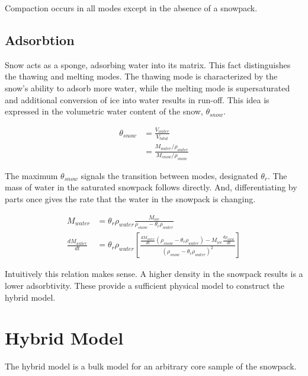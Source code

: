 \documentclass{article}
\begin{document}
Compaction occurs in all modes except in the
absence of a snowpack.


\subsection{Adsorbtion}

Snow acts as a sponge, adsorbing water into its matrix.
This fact distinguishes the thawing and melting modes.
The thawing mode is characterized by the snow's ability
to adsorb more water, while the melting mode is supersaturated
and additional conversion of ice into water results in run-off.
This idea is expressed in the volumetric water content of the snow,
$\theta_{snow}$.

\begin{align}
\theta_{snow} &= \frac{V_{water}}{V_{total}} \\
   &= \frac{M_{water}/ \rho_{water}}{M_{snow}/\rho_{snow}}
\end{align}

The maximum $\theta_{snow}$ signals the transition between
modes, designated $\theta_{r}$.
The mass of water in the saturated snowpack follows directly.
And, differentiating by parts once gives the rate that the water in the
snowpack is changing.

\begin{align}
M_{water}  &= \theta_{r} \rho_{water}
      \frac{M_{ice}}{\rho_{snow} - \theta_{r} \rho_{water}} \\
\frac{d M_{water}}{dt} &=  \theta_{r} \rho_{water}
   \left[ \frac{\frac{d M_{water}}{dt} (\rho_{snow} - \theta_{r} \rho_{water})
                  - M_{ice} \frac{d \rho_{snow}}{dt} }
          {(\rho_{snow} - \theta_{r} \rho_{water})^2} \right]
\end{align}

Intuitively this relation makes sense.
A higher density in the snowpack results is a lower adsorbtivity.
These provide a sufficient physical model to construct the hybrid model.


\section{Hybrid Model}

The hybrid model is a bulk model for an arbitrary core
sample of the snowpack.
\end{document}
